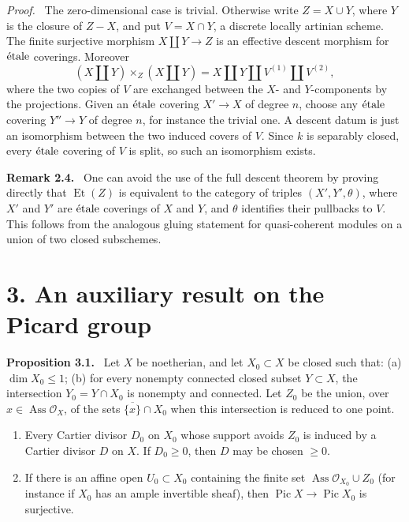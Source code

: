 \documentclass[12pt]{article}
\newcommand{\Oo}{\mathcal{O}}
\newcommand{\Ass}{\operatorname{Ass}}
\newcommand{\Pic}{\operatorname{Pic}}
\newcommand{\Et}{\operatorname{Et}}
\newcommand{\etale}{\ifmmode\textnormal{\'etale}\else\'etale\fi}
\newenvironment{statement}[1]{\par\medskip\noindent\textbf{#1.}\ }{\par\medskip}
\newenvironment{remarktext}[1]{\par\medskip\noindent\textbf{#1.}\ }{\par\medskip}
\newenvironment{prooftext}[1][Proof]{\par\noindent\emph{#1.}\ }{\par\medskip}
\begin{document}
\begin{prooftext}
The zero-dimensional case is trivial. Otherwise write \(Z=X\cup Y\), where \(Y\) is the closure of \(Z-X\), and put \(V=X\cap Y\), a discrete locally artinian scheme. The finite surjective morphism \(X\amalg Y\to Z\) is an effective descent morphism for \(\etale\) coverings. Moreover
\[
(X\amalg Y)\times_Z(X\amalg Y)=X\amalg Y\amalg V^{(1)}\amalg V^{(2)},
\]
where the two copies of \(V\) are exchanged between the \(X\)- and \(Y\)-components by the projections. Given an \(\etale\) covering \(X'\to X\) of degree \(n\), choose any \(\etale\) covering \(Y''\to Y\) of degree \(n\), for instance the trivial one. A descent datum is just an isomorphism between the two induced covers of \(V\). Since \(k\) is separably closed, every \(\etale\) covering of \(V\) is split, so such an isomorphism exists.
\end{prooftext}

\begin{remarktext}{Remark 2.4}
One can avoid the use of the full descent theorem by proving directly that \(\Et(Z)\) is equivalent to the category of triples \((X',Y',\theta)\), where \(X'\) and \(Y'\) are \(\etale\) coverings of \(X\) and \(Y\), and \(\theta\) identifies their pullbacks to \(V\). This follows from the analogous gluing statement for quasi-coherent modules on a union of two closed subschemes.
\end{remarktext}

\section*{3. An auxiliary result on the Picard group}

\begin{statement}{Proposition 3.1}
Let \(X\) be noetherian, and let \(X_0\subset X\) be closed such that: (a) \(\dim X_0\le1\); (b) for every nonempty connected closed subset \(Y\subset X\), the intersection \(Y_0=Y\cap X_0\) is nonempty and connected. Let \(Z_0\) be the union, over \(x\in\Ass\Oo_X\), of the sets \(\overline{\{x\}}\cap X_0\) when this intersection is reduced to one point.
\begin{enumerate}[label=(\roman*)]
\item Every Cartier divisor \(D_0\) on \(X_0\) whose support avoids \(Z_0\) is induced by a Cartier divisor \(D\) on \(X\). If \(D_0\ge0\), then \(D\) may be chosen \(\ge0\).
\item If there is an affine open \(U_0\subset X_0\) containing the finite set \(\Ass\Oo_{X_0}\cup Z_0\) (for instance if \(X_0\) has an ample invertible sheaf), then \(\Pic X\to\Pic X_0\) is surjective.
\end{enumerate}
\end{statement}
\end{document}

